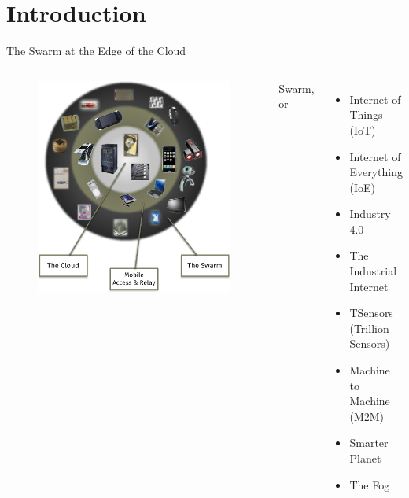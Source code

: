 \section{Introduction}

\begin{frame}{The Swarm at the Edge of the Cloud}
  \pause

  \begin{columns}
    \begin{figure}
      \includegraphics[width=\textwidth]{figures/swarm_jan.pdf}
    \end{figure}

    \pause

    Swarm, or
    \begin{itemize}
    \item Internet of Things (IoT)
    \item Internet of Everything (IoE)
    \item Industry 4.0
    \item The Industrial Internet
    \item TSensors (Trillion Sensors)
    \item Machine to Machine (M2M)
    \item Smarter Planet
    \item The Fog
    \end{itemize}
  \end{columns}
\end{frame}

